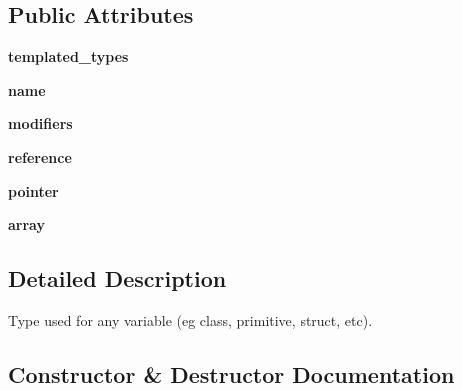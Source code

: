 \subsection*{Public Attributes}
\begin{DoxyCompactItemize}
\item 
{\bfseries templated\+\_\+types}\hypertarget{classcpp_1_1ast_1_1Type_a7c38fcafa00dae6ee22bab783086a1a7}{}\label{classcpp_1_1ast_1_1Type_a7c38fcafa00dae6ee22bab783086a1a7}

\item 
{\bfseries name}\hypertarget{classcpp_1_1ast_1_1Type_a5905424e2b65f0215b6ecd73b4bfe24c}{}\label{classcpp_1_1ast_1_1Type_a5905424e2b65f0215b6ecd73b4bfe24c}

\item 
{\bfseries modifiers}\hypertarget{classcpp_1_1ast_1_1Type_a0effa0a077eda79943e881955b4c51a5}{}\label{classcpp_1_1ast_1_1Type_a0effa0a077eda79943e881955b4c51a5}

\item 
{\bfseries reference}\hypertarget{classcpp_1_1ast_1_1Type_a8d2cddd631397c3bf86198cc420d584d}{}\label{classcpp_1_1ast_1_1Type_a8d2cddd631397c3bf86198cc420d584d}

\item 
{\bfseries pointer}\hypertarget{classcpp_1_1ast_1_1Type_a37234bb68915c93894cbc8e366c1eaad}{}\label{classcpp_1_1ast_1_1Type_a37234bb68915c93894cbc8e366c1eaad}

\item 
{\bfseries array}\hypertarget{classcpp_1_1ast_1_1Type_a1fd0493e82da315bcb4c02b0cf2133a3}{}\label{classcpp_1_1ast_1_1Type_a1fd0493e82da315bcb4c02b0cf2133a3}

\end{DoxyCompactItemize}


\subsection{Detailed Description}
\begin{DoxyVerb}Type used for any variable (eg class, primitive, struct, etc).\end{DoxyVerb}
 

\subsection{Constructor \& Destructor Documentation}
